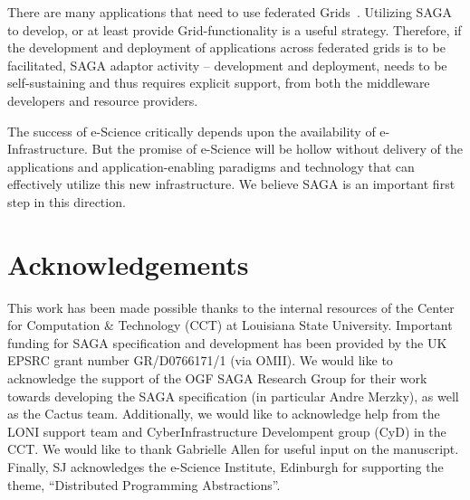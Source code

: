 \documentclass[conference,final]{IEEEtran}
\newcommand{\jhanote}[1]{ {\textcolor{red} { ***Jha: #1 }}}
\begin{document}

There are many applications that need to use federated
Grids~\cite{clade06, gin_paper}.  Utilizing SAGA to develop, or at
least provide Grid-functionality is a useful strategy. Therefore, if
the development and deployment of applications across federated grids
is to be facilitated, SAGA adaptor activity -- development and
deployment, needs to be self-sustaining and thus requires explicit
support, from both the middleware developers and resource providers.

The success of e-Science critically depends upon the availability of
e-Infrastructure.  But the promise of e-Science will be hollow without
delivery of the applications and application-enabling paradigms and
technology that can effectively utilize this new infrastructure. We
believe SAGA is an important first step in this direction.

\section{Acknowledgements}

This work has been made possible thanks to the internal resources of
the Center for Computation \& Technology (CCT) at Louisiana State
University.  Important funding for SAGA specification and development
has been provided by the UK EPSRC grant number GR/D0766171/1 (via
OMII).  We would like to acknowledge the support of the OGF SAGA
Research Group for their work towards developing the SAGA
specification (in particular Andre Merzky), as well as the Cactus
team.  Additionally, we would like to acknowledge help from the LONI
support team and CyberInfrastructure Develompent group (CyD) in the
CCT.  We would like to thank Gabrielle Allen for useful input on the
manuscript. Finally, SJ acknowledges the e-Science Institute, Edinburgh for
supporting the theme, ``Distributed Programming Abstractions''.



\end{document}
